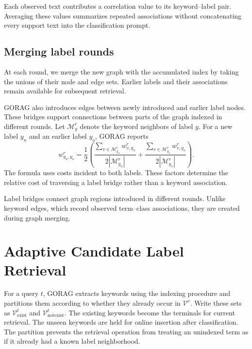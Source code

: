 Each observed text contributes a correlation value to its keyword--label pair. Averaging these values summarizes repeated associations without concatenating every support text into the classification prompt.

\subsection{Merging label rounds}
\label{sec:gorag:merge}

At each round, we merge the new graph with the accumulated index by taking the unions of their node and edge sets. Earlier labels and their associations remain available for subsequent retrieval.

GORAG also introduces edges between newly introduced and earlier label nodes. These bridges support connections between parts of the graph indexed in different rounds. Let $\mathcal{M}_y^r$ denote the keyword neighbors of label $y$. For a new label $y_n$ and an earlier label $y_o$, GORAG reports
\begin{equation}
w_{y_n,y_o}^r=\frac{1}{2}\left(
\frac{\sum_{v\in\mathcal{M}_{y_n}^r}w_{v,y_n}^r}{2|\mathcal{M}_{y_n}^r|}
+\frac{\sum_{v\in\mathcal{M}_{y_o}^r}w_{v,y_o}^r}{2|\mathcal{M}_{y_o}^r|}
\right).
\label{eq:gorag:labelbridge}
\end{equation}
The formula uses costs incident to both labels. These factors determine the relative cost of traversing a label bridge rather than a keyword association.

Label bridges connect graph regions introduced in different rounds. Unlike keyword edges, which record observed term--class associations, they are created during graph merging.

\section{Adaptive Candidate Label Retrieval}
\label{sec:gorag:retrieval}

For a query $t$, GORAG extracts keywords using the indexing procedure and partitions them according to whether they already occur in $\mathcal{V}^r$. Write these sets as $\mathcal{V}_{\mathrm{exist}}^t$ and $\mathcal{V}_{\mathrm{notexist}}^t$. The existing keywords become the terminals for current retrieval. The unseen keywords are held for online insertion after classification. The partition prevents the retrieval operation from treating an unindexed term as if it already had a known label neighborhood.

